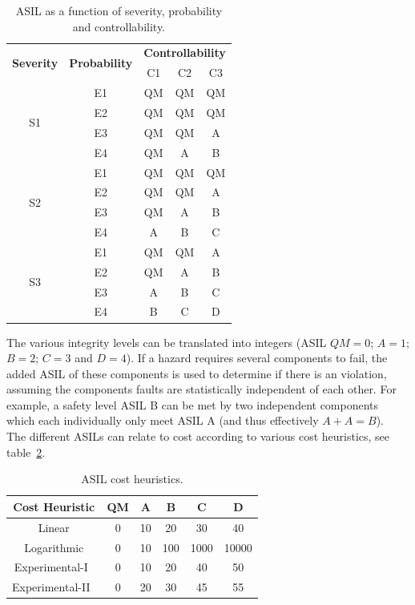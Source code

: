 \begin{table}[H]
\centering
\begin{tabular}{|c|c|c|c|c|}
\hline
\multirow{2}{*}{\textbf{Severity}} &\multirow{2}{*}{\textbf{Probability}} &\multicolumn{3}{|c|}{\textbf{Controllability}} \\ \cline{3-5}
 & &C1 &C2 &C3 \\ \hline
\multirow{4}{*}{S1} & E1 & QM & QM & QM \\ \cline{2-5}
 & E2 & QM & QM & QM \\ \cline{2-5}
 & E3 & QM & QM & A \\ \cline{2-5}
 & E4 & QM & A & B \\ \hline
\multirow{4}{*}{S2} & E1 & QM & QM & QM \\ \cline{2-5}
 & E2 & QM & QM & A \\ \cline{2-5}
 & E3 & QM & A & B \\ \cline{2-5}
 & E4 & A & B & C \\ \hline
\multirow{4}{*}{S3} & E1 & QM & QM & A \\ \cline{2-5}
 & E2 & QM & A & B \\ \cline{2-5}
 & E3 & A & B & C \\ \cline{2-5}
 & E4 & B & C & D \\ \hline
\end{tabular}
\caption{ASIL as a function of severity, probability and controllability.}
\label{table:ASIL}
\end{table}

The various integrity levels can be translated into integers (ASIL $QM = 0$; $A = 1$; $B = 2$; $C = 3$ and $D = 4$). If a hazard requires several components to fail, the added ASIL of these components is used to determine if there is an violation, assuming the components faults are statistically independent of each other. For example, a safety level ASIL B can be met by two independent components which each individually only meet ASIL A (and thus effectively $A + A = B$).~\cite{azevedo2014} \\ %

The different ASILs can relate to cost according to various cost heuristics, see table~\ref{table:cost_heuritics}. %

\begin{table}[H]
\centering
\begin{tabular}{|c|c|c|c|c|c|}
\hline
\textbf{Cost Heuristic} & \textbf{QM} & \textbf{A} & \textbf{B} & \textbf{C} & \textbf{D} \\ \hline
Linear & 0 & 10 & 20 & 30 & 40 \\ \hline
Logarithmic & 0 & 10 & 100 & 1000 & 10000 \\ \hline
Experimental-I~\cite{azevedo2014} & 0 & 10 & 20 & 40 & 50 \\ \hline
Experimental-II~\cite{azevedo2014} & 0 & 20 & 30 & 45 & 55 \\ \hline
\end{tabular}
\caption{ASIL cost heuristics.}
\label{table:cost_heuritics}
\end{table}


